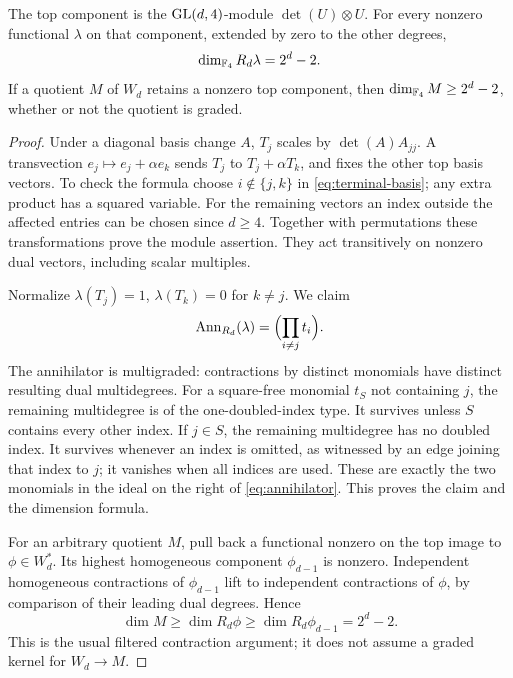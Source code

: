 \begin{lemma}\label{lem:top-contraction}
The top component is the \(\operatorname{GL}(d,4)\)-module \(\det(U)\otimes U\).
For every nonzero functional \(\lambda\) on that component, extended
by zero to the other degrees,
\[
 \dim_{\mathbb F_4}R_d\lambda=2^d-2.
\]
If a quotient \(M\) of \(W_d\) retains a nonzero top component, then
\(\dim_{\mathbb F_4}M\ge2^d-2\), whether or not the quotient is graded.
\end{lemma}
\begin{proof}
Under a diagonal basis change \(A\), \(T_j\) scales by
\(\det(A)A_{jj}\). A transvection \(e_j\mapsto e_j+\alpha e_k\)
sends \(T_j\) to \(T_j+\alpha T_k\), and fixes the other top basis
vectors. To check the formula choose \(i\notin\{j,k\}\) in
\eqref{eq:terminal-basis}; any extra product has a squared variable.
For the remaining vectors an index outside the affected entries can
be chosen since \(d\ge4\).
Together with permutations these transformations prove the module assertion.
They act transitively on nonzero dual vectors, including scalar multiples.

Normalize \(\lambda(T_j)=1\), \(\lambda(T_k)=0\) for \(k\ne j\).
We claim
\begin{equation}\label{eq:annihilator}
 \operatorname{Ann}_{R_d}(\lambda)=\Bigl(\prod_{i\ne j}t_i\Bigr).
\end{equation}
The annihilator is multigraded: contractions by distinct monomials have
distinct resulting dual multidegrees. For a square-free monomial \(t_S\)
not containing \(j\), the remaining multidegree is of the one-doubled-index
type. It survives unless \(S\) contains every other index.
If \(j\in S\), the remaining multidegree has no doubled index.
It survives whenever an index is omitted, as witnessed by an edge
joining that index to \(j\); it vanishes when all indices are used.
These are exactly the two monomials in the ideal on the right of
\eqref{eq:annihilator}. This proves the claim and the dimension formula.

For an arbitrary quotient \(M\), pull back a functional nonzero on the
top image to \(\phi\in W_d^*\). Its highest homogeneous component
\(\phi_{d-1}\) is nonzero. Independent homogeneous contractions of
\(\phi_{d-1}\) lift to independent contractions of \(\phi\), by
comparison of their leading dual degrees. Hence
\[
 \dim M\ge\dim R_d\phi\ge\dim R_d\phi_{d-1}=2^d-2.
\]
This is the usual filtered contraction argument; it does not assume a
graded kernel for \(W_d\to M\).
\end{proof}

